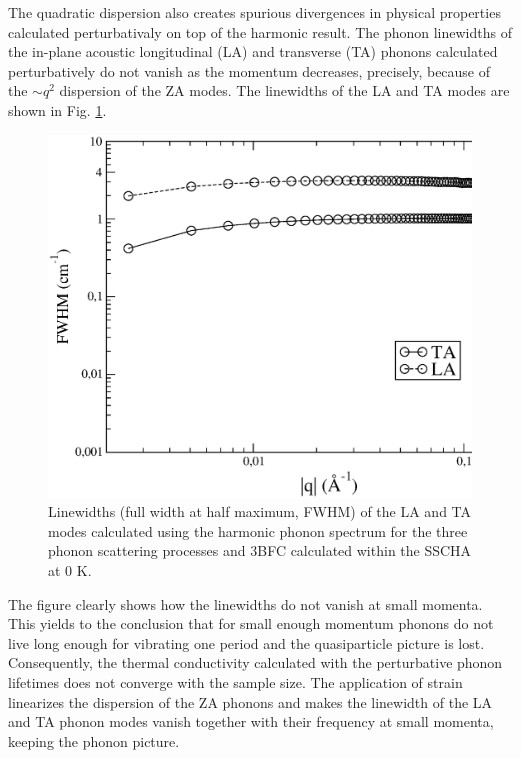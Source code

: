 The quadratic dispersion also creates spurious divergences in physical properties calculated perturbativaly on top of 
the harmonic result. The phonon linewidths of the in-plane acoustic longitudinal (LA) and transverse (TA) phonons 
calculated perturbatively do not vanish as the momentum decreases\cite{paulatto2013anharmonic}, precisely, because of 
the $\sim q^2$ dispersion of the ZA modes\cite{bonini2012acoustic}. The linewidths of the LA and TA modes are shown 
in Fig. \ref{lata-harmonic-lw}. 
\begin{figure}[h]
\includegraphics[width=0.8\linewidth]{Figures/lw-graphene-harmonic.eps}
\caption[Graphene harmonic linewidths]{Linewidths (full width at half maximum, FWHM) of the LA and TA modes 
	calculated using the harmonic phonon spectrum for the three phonon scattering processes and 3BFC calculated 
	within the SSCHA at $0$ K.}
\label{lata-harmonic-lw}
\end{figure}
The figure clearly shows how the linewidths do not vanish at small momenta. This yields to the conclusion that for 
small enough momentum phonons do not live long enough for vibrating one period and the quasiparticle picture is lost. 
Consequently, the thermal conductivity calculated with the perturbative phonon 
lifetimes\cite{fugallo2013ab,fugallo2014thermal} does not converge with the sample size\cite{bonini2012acoustic}.
The application of strain linearizes the dispersion of the ZA phonons and makes the linewidth of the LA and TA 
phonon modes vanish together with their frequency at small momenta, keeping the phonon 
picture\cite{bonini2012acoustic}. \\

